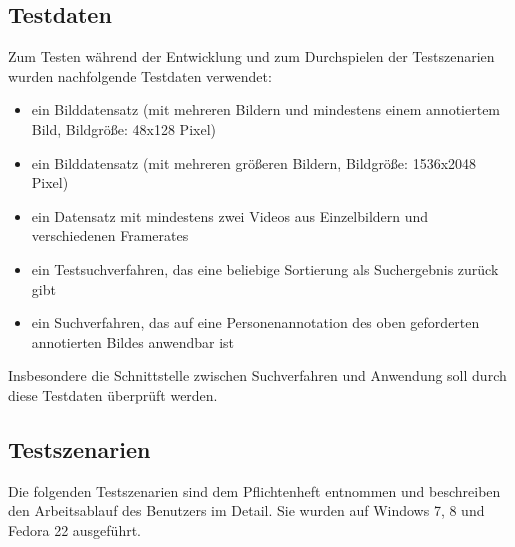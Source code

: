 \subsection{Testdaten}
Zum Testen während der Entwicklung und zum Durchspielen der Testszenarien wurden nachfolgende Testdaten verwendet:
\begin{itemize}
	\item ein Bilddatensatz (mit mehreren Bildern und mindestens einem annotiertem Bild, Bildgröße: 48x128 Pixel)
	\item ein Bilddatensatz (mit mehreren größeren Bildern, Bildgröße: 1536x2048 Pixel)
	\item ein Datensatz mit mindestens zwei Videos aus Einzelbildern und verschiedenen Framerates
	\item ein Testsuchverfahren, das eine beliebige Sortierung als Suchergebnis zurück gibt
	\item ein Suchverfahren, das auf eine Personenannotation des oben geforderten annotierten Bildes anwendbar ist
\end{itemize}
Insbesondere die Schnittstelle zwischen Suchverfahren und Anwendung soll durch diese Testdaten überprüft werden.

\subsection{Testszenarien}
Die folgenden Testszenarien sind dem Pflichtenheft entnommen und beschreiben den Arbeitsablauf des Benutzers im Detail. Sie wurden auf Windows 7, 8 und Fedora 22 ausgeführt.
\pagebreak
